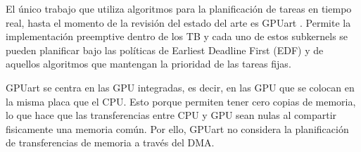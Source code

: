 El único trabajo que utiliza algoritmos para la planificación de tareas en tiempo real, hasta el momento de la revisión del estado del arte es GPUart \cite{GPUArt}. 
Permite la implementación preemptive dentro de los TB y cada uno de estos subkernels se pueden planificar bajo las políticas de Earliest Deadline First (EDF) y de aquellos algoritmos que mantengan la prioridad de las tareas fijas.
\newline

GPUart se centra en las GPU integradas, es decir, en las GPU que se colocan en la misma placa que el CPU. Esto porque permiten tener cero copias de memoria, lo que hace que las transferencias entre CPU y GPU sean nulas al compartir fisicamente una memoria común. 
Por ello, GPUart no considera la planificación de transferencias de memoria a través del DMA.
\newline
 	
